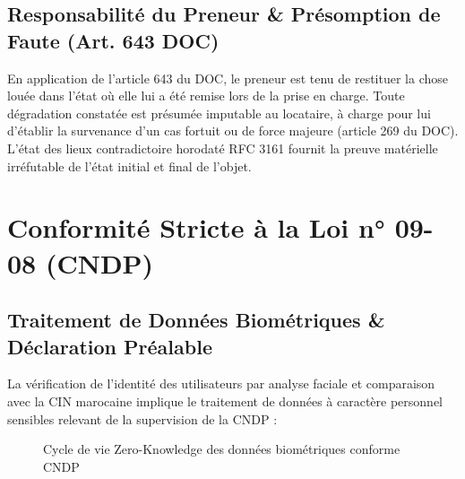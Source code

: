 \documentclass[11pt,a4paper]{report}
\begin{document}
\section{Responsabilité du Preneur \& Présomption de Faute (Art. 643 DOC)}
En application de l'article 643 du DOC, le preneur est tenu de restituer la chose louée dans l'état où elle lui a été remise lors de la prise en charge. Toute dégradation constatée est présumée imputable au locataire, à charge pour lui d'établir la survenance d'un cas fortuit ou de force majeure (article 269 du DOC). L'état des lieux contradictoire horodaté RFC 3161 fournit la preuve matérielle irréfutable de l'état initial et final de l'objet.

\chapter{Conformité Stricte à la Loi n° 09-08 (CNDP)}

\section{Traitement de Données Biométriques \& Déclaration Préalable}
La vérification de l'identité des utilisateurs par analyse faciale et comparaison avec la CIN marocaine implique le traitement de données à caractère personnel sensibles relevant de la supervision de la CNDP :

\begin{figure}[h!]
\centering
{}
\caption{Cycle de vie Zero-Knowledge des données biométriques conforme CNDP}
\end{figure}
\end{document}
